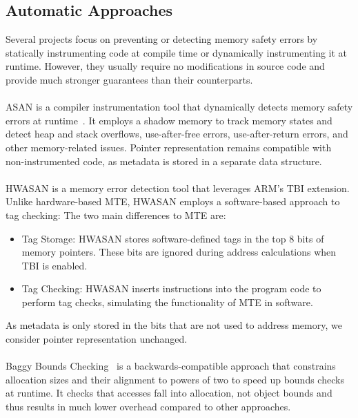 \subsection{Automatic Approaches}
\label{subsec:automatic-approaches}

Several projects focus on preventing or detecting memory safety errors by statically instrumenting code at compile time or dynamically instrumenting it at runtime.
However, they usually require no modifications in source code and provide much stronger guarantees than their counterparts.

\paragraph{}
\Acl{ASAN} is a compiler instrumentation tool that dynamically detects memory safety errors at runtime~\cite{serebryany2012addresssanitizer}.
It employs a shadow memory to track memory states and detect heap and stack overflows, use-after-free errors, use-after-return errors, and other memory-related issues.
Pointer representation remains compatible with non-instrumented code, as metadata is stored in a separate data structure.

\paragraph{}
\Acl{HWASAN} is a memory error detection tool that leverages ARM's \ac{TBI} extension.
Unlike hardware-based \ac{MTE}, \ac{HWASAN} employs a software-based approach to tag checking:
The two main differences to \ac{MTE} are:
\begin{itemize}
    \item Tag Storage: \ac{HWASAN} stores software-defined tags in the top 8 bits of memory pointers.
    These bits are ignored during address calculations when TBI is enabled.
    \item Tag Checking: \ac{HWASAN} inserts instructions into the program code to perform tag checks, simulating the functionality of \ac{MTE} in software.
\end{itemize}
As metadata is only stored in the bits that are not used to address memory, we consider pointer representation unchanged.

\paragraph{}
Baggy Bounds Checking~\cite{akritidis2009baggy} is a backwards-compatible approach that constrains allocation sizes and their alignment to powers of two to speed up bounds checks at runtime.
It checks that accesses fall into allocation, not object bounds and thus results in much lower overhead compared to other approaches.

